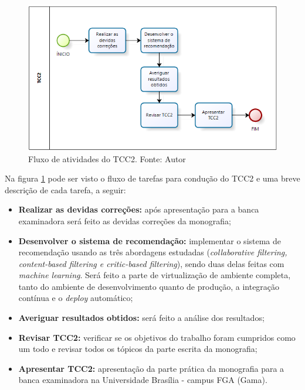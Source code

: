\begin{figure}[H]
    \centering
    \includegraphics[scale=0.9]{figuras/proposta/fluxo_atividade_tcc2.png}
    \caption[Fluxo de atividades do TCC2]{Fluxo de atividades do TCC2. Fonte: Autor}
    \label{fig:fluxo_atividade_tcc2}
\end{figure}

Na figura \ref{fig:fluxo_atividade_tcc2} pode ser visto o fluxo de tarefas para condução do TCC2 e uma breve descrição de cada tarefa, a seguir:

\begin{itemize}
    \item \textbf{Realizar as devidas correções:} após apresentação para a banca examinadora será feito as devidas correções da monografia;

    \item \textbf{Desenvolver o sistema de recomendação:} implementar o sistema de recomendação usando as três abordagens estudadas (\textit{collaborative filtering, content-based filtering e critic-based filtering}), sendo duas delas feitas com \textit{machine learning}. Será feito a parte de virtualização de ambiente completa, tanto do ambiente de desenvolvimento quanto de produção, a integração contínua e o \textit{deploy} automático;

    \item \textbf{Averiguar resultados obtidos:} será feito a análise dos resultados;
    
    \item \textbf{Revisar TCC2:} verificar se os objetivos do trabalho foram cumpridos como um todo e revisar todos os tópicos da parte escrita da monografia;

    \item \textbf{Apresentar TCC2:} apresentação da parte prática da monografia para a banca examinadora na Universidade Brasília - campus FGA (Gama).
    
\end{itemize}

